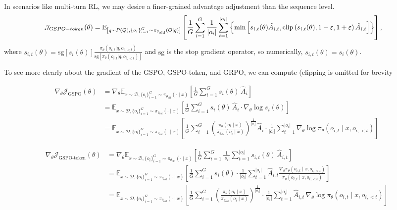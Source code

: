In scenarios like multi-turn RL, we may desire a finer-grained advantage adjustment than the sequence level.
\begin{align}
& {\cal J}_{GSPO-token}(\theta) \nonumber =\mathbb{E}_{\left[q \sim P(Q),\left\{o_i\right\}_{i=1}^G \sim \pi_{\theta_{\text{old}}}(O | q)\right]} \left[\frac{1}{G} \sum_{i=1}^G \frac{1}{\left|o_i\right|} \sum_{t=1}^{\left|o_i\right|}\left\{ \min\left[s_{i,t}(\theta)\hat{A}_{i, t}, \operatorname{clip}\left(s_{i,t}(\theta), 1-\varepsilon, 1+\varepsilon\right) \hat{A}_{i, t}\right]\right\}\right],
\end{align}
where $s_{i,t}(\theta) = \text{sg}[s_i(\theta)] \frac{\pi_\theta\left(o_{i, t} | q, o_{i,<t}\right)}{\text{sg}\left[\pi_{\theta}\left(o_{i, t} | q, o_{i,<t}\right)\right]}$ and $\text{sg}$ is the stop gradient operator, so numerically, $s_{i,t}(\theta) = s_i(\theta)$. 


To see more clearly about the gradient of the GSPO, GSPO-token, and GRPO, we can compute (clipping is omitted for brevity

\begin{align*}
\nabla_\theta \mathcal{J}_{\mathrm{GSPO}}(\theta)
&= \nabla_\theta \mathbb{E}_{x \sim \mathcal{D}, \{o_i\}_{i=1}^G \sim \pi_{\theta_{\text{old}}}(\cdot \mid x)}
\left[
\frac{1}{G} \sum_{i=1}^G s_i(\theta)\, \hat{A}_i
\right]  \\
&= \mathbb{E}_{x \sim \mathcal{D}, \{o_i\}_{i=1}^G \sim \pi_{\theta_{\text{old}}}(\cdot \mid x)}
\left[
\frac{1}{G} \sum_{i=1}^G s_i(\theta)\, \hat{A}_i \cdot \nabla_\theta \log s_i(\theta)
\right]  \\
&= \mathbb{E}_{x \sim \mathcal{D}, \{o_i\}_{i=1}^G \sim \pi_{\theta_{\text{old}}}(\cdot \mid x)}
\left[
\frac{1}{G} \sum_{i=1}^G 
\left(
\frac{\pi_\theta(o_i \mid x)}{\pi_{\theta_{\text{old}}}(o_i \mid x)}
\right)^{\frac{1}{|o_i|}}
\hat{A}_i \cdot \frac{1}{|o_i|} \sum_{t=1}^{|o_i|}
\nabla_\theta \log \pi_\theta(o_{i,t} \mid x, o_{i,<t})
\right] 
\end{align*}

\begin{align*}
\nabla_\theta \mathcal{J}_{\mathrm{GSPO\text{-}token}}(\theta)
&= \nabla_\theta \mathbb{E}_{x \sim \mathcal{D}, \{o_i\}_{i=1}^G \sim \pi_{\theta_{\text{old}}}(\cdot \mid x)}
\left[
\frac{1}{G} \sum_{i=1}^G \frac{1}{|o_i|} \sum_{t=1}^{|o_i|} s_{i,t}(\theta)\, \hat{A}_{i,t}
\right] \\
&= \mathbb{E}_{x \sim \mathcal{D}, \{o_i\}_{i=1}^G \sim \pi_{\theta_{\text{old}}}(\cdot \mid x)}
\left[
\frac{1}{G} \sum_{i=1}^G s_i(\theta) \cdot \frac{1}{|o_i|}
\sum_{t=1}^{|o_i|}
\hat{A}_{i,t} \frac{\nabla_\theta \pi_\theta(o_{i,t} \mid x, o_{i,<t})}
{\pi_\theta(o_{i,t} \mid x, o_{i,<t})}
\right] \\
&= \mathbb{E}_{x \sim \mathcal{D}, \{o_i\}_{i=1}^G \sim \pi_{\theta_{\text{old}}}(\cdot \mid x)}
\left[
\frac{1}{G} \sum_{i=1}^G 
\left(
\frac{\pi_\theta(o_i \mid x)}{\pi_{\theta_{\text{old}}}(o_i \mid x)}
\right)^{\frac{1}{|o_i|}}
\cdot \frac{1}{|o_i|}
\sum_{t=1}^{|o_i|}
\hat{A}_{i,t}\, \nabla_\theta \log \pi_\theta(o_{i,t} \mid x, o_{i,<t})
\right]
\end{align*}

